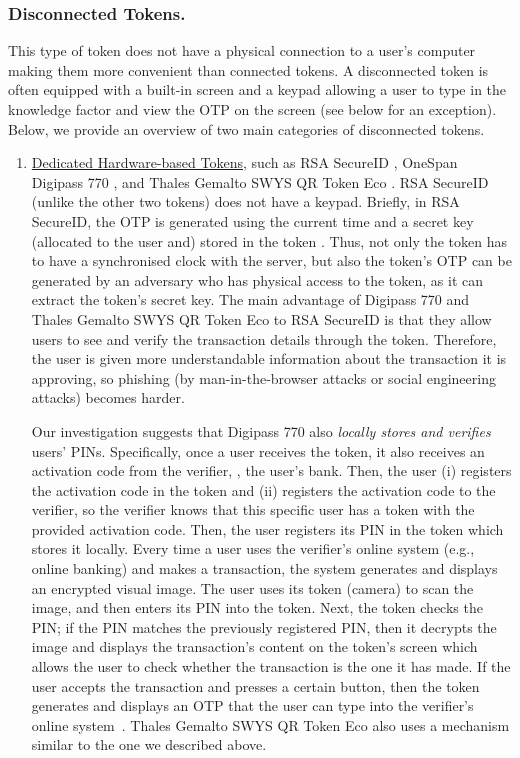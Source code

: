 \subsubsection{Disconnected Tokens.}

This type of token does not have a physical connection to a user's computer making them more convenient than connected tokens. A disconnected token is often equipped with a built-in screen and a keypad allowing a user to type in the knowledge factor and view the OTP on the screen (see below for an exception).  Below, we provide an overview of two main categories of disconnected tokens.

\begin{enumerate}
\item \underline{Dedicated Hardware-based Tokens}, such as RSA SecureID \cite{secureID}, OneSpan Digipass 770 \cite{Digipass-website}, and Thales Gemalto SWYS QR Token Eco \cite{Gemalto}.   RSA SecureID (unlike the other two tokens) does not have a keypad. Briefly, in RSA SecureID, the OTP is generated using the current time and a secret key (allocated to the user and) stored in the token \cite{biryukov2003cryptanalysis}. Thus, not only the token has to have a synchronised clock with the server, but also the token's OTP can be generated by an adversary who has physical access to the token, as it can extract the token's secret key.  The main advantage of  Digipass 770 and Thales Gemalto SWYS QR Token Eco to RSA SecureID is that they allow users to see and verify the transaction details through the token. Therefore, the user is given more understandable information about the transaction it is approving,
so phishing (by man-in-the-browser attacks or social engineering attacks) becomes harder. 

 

Our investigation suggests that Digipass 770 also \emph{locally stores and verifies} users' PINs. 
%
Specifically, once a user receives the token, it also receives an activation code from the verifier, \eg, the user's bank.  Then, the user (i) registers the activation code in the token and (ii) registers the activation code to the verifier, so the verifier knows that this specific user has a token with the provided activation code. Then, the user registers its PIN in the token which stores it locally. Every time a user uses the verifier's online system  (e.g., online banking) and makes a transaction, the system generates and displays an encrypted visual image. The user uses its token (camera) to scan the image, and then enters its PIN into the token. Next, the token checks the PIN; if the PIN matches the previously registered PIN, then it decrypts the image and displays the transaction's content on the token's screen which allows the user to check whether the transaction is the one it has made. If the user accepts the transaction and presses a certain button, then the token generates and displays an OTP that the user can type into the verifier's online system~\cite{Digipass-website}.  Thales Gemalto SWYS QR Token Eco also uses a mechanism similar to the one we described above. 


\end{enumerate}
